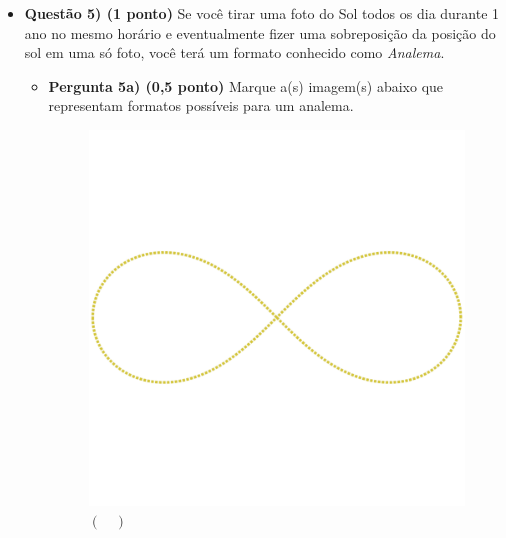 \documentclass[a4paper, 12pt]{article}
\begin{document}
\begin{flushleft}
\begin{itemize}
		\item \textbf{Questão 5) (1 ponto)} Se você tirar uma foto do Sol todos os dia durante 1 ano no mesmo horário e eventualmente fizer uma sobreposição da posição do sol em uma só foto, você terá um formato conhecido como \textit{Analema}.
			\begin{itemize}
				\item \textbf{Pergunta 5a) (0,5 ponto)} Marque a(s) imagem(s) abaixo que representam formatos possíveis para um analema.
					\begin{multicols}{2}
						\begin{figure}[H]
							\centering
							\includegraphics[scale=0.15]{./img/5a}
							\captionsetup{labelformat=empty}
							\caption{$(\quad)$}
						\end{figure}
						\begin{figure}[H]
							\centering

\end{figure}
\end{multicols}
\end{itemize}
\end{itemize}
\end{flushleft}
\end{document}
